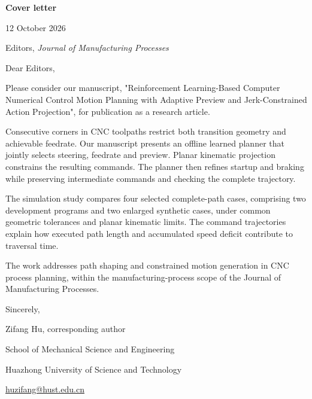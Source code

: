 \documentclass[11pt,a4paper]{article}
\begin{document}
{\large\bfseries Cover letter}\par
12 October 2026\par
Editors, \textit{Journal of Manufacturing Processes}\par
Dear Editors,\par
Please consider our manuscript, "Reinforcement Learning-Based Computer Numerical Control Motion Planning with Adaptive Preview and Jerk-Constrained Action Projection", for publication as a research article.

Consecutive corners in CNC toolpaths restrict both transition geometry and achievable feedrate. Our manuscript presents an offline learned planner that jointly selects steering, feedrate and preview. Planar kinematic projection constrains the resulting commands. The planner then refines startup and braking while preserving intermediate commands and checking the complete trajectory.

The simulation study compares four selected complete-path cases, comprising two development programs and two enlarged synthetic cases, under common geometric tolerances and planar kinematic limits. The command trajectories explain how executed path length and accumulated speed deficit contribute to traversal time.

The work addresses path shaping and constrained motion generation in CNC process planning, within the manufacturing-process scope of the Journal of Manufacturing Processes.

Sincerely,\par
Zifang Hu, corresponding author\par
School of Mechanical Science and Engineering\par
Huazhong University of Science and Technology\par
\href{mailto:huzifang@hust.edu.cn}{huzifang@hust.edu.cn}
\end{document}
